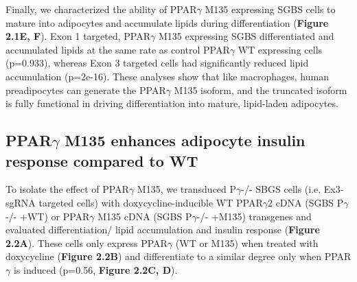 Finally, we characterized the ability of PPAR$\gamma$ M135 expressing SGBS cells to mature into adipocytes and accumulate lipids during differentiation (\textbf{Figure 2.1E, F}). Exon 1 targeted, PPAR$\gamma$ M135 expressing SGBS differentiated and accumulated lipids at the same rate as control PPAR$\gamma$ WT expressing cells (p=0.933), whereas Exon 3 targeted cells had significantly reduced lipid accumulation (p=2e-16). These analyses show that like macrophages, human preadipocytes can generate the PPAR$\gamma$ M135 isoform, and the truncated isoform is fully functional in driving differentiation into mature, lipid-laden adipocytes.

\subsection{PPAR\texorpdfstring{$\gamma$}{gamma} M135 enhances adipocyte insulin response compared to WT}

To isolate the effect of PPAR$\gamma$ M135, we transduced P$\gamma$-/- SBGS cells (i.e. Ex3-sgRNA targeted cells) with doxycycline-inducible WT PPAR$\gamma$2 cDNA (SGBS P$\gamma$-/- +WT) or PPAR$\gamma$ M135 cDNA (SGBS P$\gamma$-/- +M135) transgenes and evaluated differentiation/ lipid accumulation and insulin response (\textbf{Figure 2.2A}). These cells only express PPAR$\gamma$ (WT or M135) when treated with doxycycline (\textbf{Figure 2.2B}) and differentiate to a similar degree only when PPAR$\gamma$ is induced (p=0.56, \textbf{Figure 2.2C, D}).

